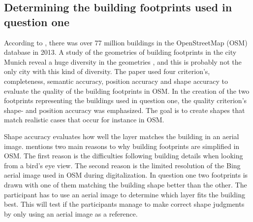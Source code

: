 \subsection[Building shapes]{Determining the building footprints used in question one}


According to \cite{Fan2014}, there was over 77 million buildings in the OpenStreetMap (OSM) database in 2013. A study of the geometries of building footprints in the city Munich reveal a huge diversity in the geometries \citep{Fan2014}, and this is probably not the only city with this kind of diversity. The \cite{Fan2014} paper used four criterion's, completeness, semantic accuracy, position accuracy and shape accuracy to evaluate the quality of the building footprints in OSM. In the creation of the two footprints representing the buildings used in question one, the quality criterion's shape- and position accuracy was emphasized. The goal is to create shapes that match realistic cases that occur for instance in OSM. 



Shape accuracy evaluates how well the layer matches the building in an aerial image. \cite{Fan2014} mentions two main reasons to why building footprints are simplified in OSM. The first reason is the difficulties following building details when looking from a bird's eye view. The second reason is the limited resolution of the Bing aerial image used in OSM during digitalization. In question one two footprints is drawn with one of them matching the building shape better than the other. The participant has to use an aerial image to determine which layer fits the building best. This will test if the participants manage to make correct shape judgments by only using an aerial image as a reference. 

